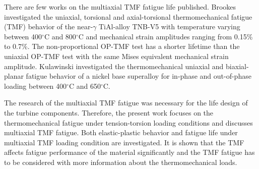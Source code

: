 There are few works on the multiaxial TMF fatigue life published.
Brookes \cite{brookes2010axial} investigated the uniaxial, torsional and axial-torsional thermomechanical fatigue (TMF) behavior of the near-$\gamma$ TiAl-alloy TNB-V5 with temperature varying between 400$^{\circ}$C and 800$^{\circ}$C and mechanical strain amplitudes ranging from 0.15\% to 0.7\%. The non-proportional OP-TMF test has a shorter lifetime than the uniaxial OP-TMF test with the same Mises equivalent mechanical strain amplitude.
Kulawinski \cite{Kulawinski201521} investigated the thermomechanical uniaxial and biaxial-planar fatigue behavior of a nickel base superalloy for in-phase and out-of-phase loading between 400$^{\circ}$C and 650$^{\circ}$C.

The research of the multiaxial TMF fatigue was necessary for the life design of the turbine components. Therefore, the present work focuses on the thermomechanical fatigue under tension-torsion loading conditions and discusses multiaxial TMF fatigue. Both elastic-plastic behavior and fatigue life under multiaxial TMF loading condition are investigated. It is shown that the TMF affects fatigue performance of the material significantly and the TMF fatigue has to be considered with more information about the thermomechanical loads. 



